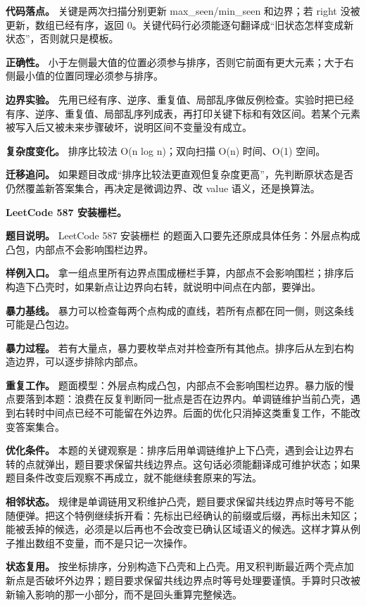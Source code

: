 \textbf{代码落点。} 关键是两次扫描分别更新 max\_seen/min\_seen 和边界；若 right 没被更新，数组已经有序，返回 0。关键代码行必须能逐句翻译成“旧状态怎样变成新状态”，否则就只是模板。

\textbf{正确性。} 小于左侧最大值的位置必须参与排序，否则它前面有更大元素；大于右侧最小值的位置同理必须参与排序。

\textbf{边界实验。} 先用已经有序、逆序、重复值、局部乱序做反例检查。实验时把已经有序、逆序、重复值、局部乱序列成表，再打印关键下标和有效区间。若某个元素被写入后又被未来步骤破坏，说明区间不变量没有成立。

\textbf{复杂度变化。} 排序比较法 O(n log n)；双向扫描 O(n) 时间、O(1) 空间。

\textbf{迁移追问。} 如果题目改成“排序比较法更直观但复杂度更高”，先判断原状态是否仍然覆盖新答案集合，再决定是微调边界、改 value 语义，还是换算法。

\noindent\textbf{LeetCode 587 安装栅栏。}

\textbf{题目说明。} LeetCode 587 安装栅栏 的题面入口要先还原成具体任务：外层点构成凸包，内部点不会影响围栏边界。

\textbf{样例入口。} 拿一组点里所有边界点围成栅栏手算，内部点不会影响围栏；排序后构造下凸壳时，如果新点让边界向右转，就说明中间点在内部，要弹出。

\textbf{暴力基线。} 暴力可以检查每两个点构成的直线，若所有点都在同一侧，则这条线可能是凸包边。

\textbf{暴力过程。} 若有大量点，暴力要枚举点对并检查所有其他点。排序后从左到右构造边界，可以逐步排除内部点。

\textbf{重复工作。} 题面模型：外层点构成凸包，内部点不会影响围栏边界。暴力版的慢点要落到本题：浪费在反复判断同一批点是否在边界内。单调链维护当前凸壳，遇到右转时中间点已经不可能留在外边界。后面的优化只消掉这类重复工作，不能改变答案集合。

\textbf{优化条件。} 本题的关键观察是：排序后用单调链维护上下凸壳，遇到会让边界右转的点就弹出，题目要求保留共线边界点。这句话必须能翻译成可维护状态；如果题目条件改变后观察不再成立，就不能继续套原来的写法。

\textbf{相邻状态。} 规律是单调链用叉积维护凸壳，题目要求保留共线边界点时等号不能随便弹。把这个特例继续拆开看：先标出已经确认的前缀或后缀，再标出未知区；能被丢掉的候选，必须是以后再也不会改变已确认区域语义的候选。这样才算从例子推出数组不变量，而不是只记一次操作。

\textbf{状态复用。} 按坐标排序，分别构造下凸壳和上凸壳。用叉积判断最近两个壳点加新点是否破坏外边界；题目要求保留共线边界点时等号处理要谨慎。手算时只改被新输入影响的那一小部分，而不是回头重算完整候选。

